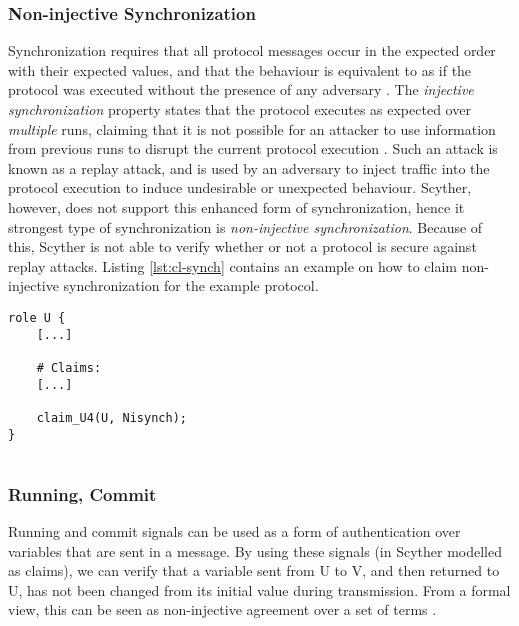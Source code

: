 \subsubsection{Non-injective Synchronization}

Synchronization requires that all protocol messages occur in the expected order with their expected values, and that the behaviour is equivalent to as if the protocol was executed without the presence of any adversary \cite{cremers2006injective}. The \emph{injective synchronization} property states that the protocol executes as expected over \emph{multiple} runs, claiming that it is not possible for an attacker to use information from previous runs to disrupt the current protocol execution \cite{cremers2005operational}. Such an attack is known as a replay attack, and is used by an adversary to inject traffic into the protocol execution to induce undesirable or unexpected behaviour. Scyther, however, does not support this enhanced form of synchronization, hence it strongest type of synchronization is \emph{non-injective synchronization}. Because of this, Scyther is not able to verify whether or not a protocol is secure against replay attacks. Listing \ref{lst:cl-synch} contains an example on how to claim non-injective synchronization for the example protocol.\newline

\begin{lstlisting}[caption={Claim for declaring non-injective synchronization in Scyther.}, label={lst:cl-synch}]
role U {
	[...]

	# Claims:	
	[...]
	
	claim_U4(U, Nisynch);
}


\end{lstlisting}



\subsubsection{Running, Commit}

Running and commit signals can be used as a form of authentication over variables that are sent in a message. By using these signals (in Scyther modelled as claims), we can verify that a variable sent from U to V, and then returned to U, has not been changed from its initial value during transmission. From a formal view, this can be seen as non-injective agreement over a set of terms \cite{scyther-manual}.

